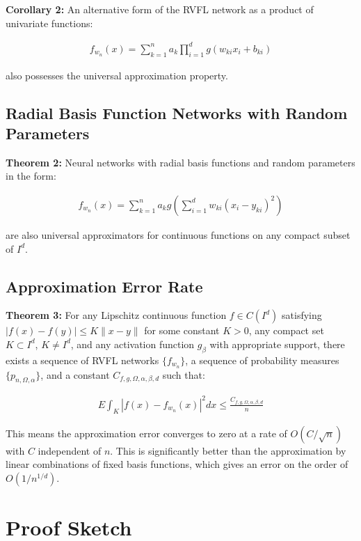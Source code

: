 \documentclass[11pt]{article}
\begin{document}
\textbf{Corollary 2:} An alternative form of the RVFL network as a product of univariate functions:

\begin{align}
f_{w_n}(x) = \sum_{k=1}^n a_k \prod_{i=1}^d g(w_{ki}x_i+b_{ki})
\end{align}

also possesses the universal approximation property.

\subsection{Radial Basis Function Networks with Random Parameters}

\textbf{Theorem 2:} Neural networks with radial basis functions and random parameters in the form:

\begin{align}
f_{w_n}(x) = \sum_{k=1}^n a_k g\left(\sum_{i=1}^d w_{ki}(x_i-y_{ki})^2\right)
\end{align}

are also universal approximators for continuous functions on any compact subset of $I^d$.

\subsection{Approximation Error Rate}

\textbf{Theorem 3:} For any Lipschitz continuous function $f \in C(I^d)$ satisfying $|f(x) - f(y)| \leq K\|x-y\|$ for some constant $K > 0$, any compact set $K \subset I^d$, $K \neq I^d$, and any activation function $g_{\beta}$ with appropriate support, there exists a sequence of RVFL networks $\{f_{w_n}\}$, a sequence of probability measures $\{p_{n,\Omega,\alpha}\}$, and a constant $C_{f,g,\Omega,\alpha,\beta,d}$ such that:

\begin{align}
E\int_K |f(x) - f_{w_n}(x)|^2 dx \leq \frac{C_{f,g,\Omega,\alpha,\beta,d}}{n}
\end{align}

This means the approximation error converges to zero at a rate of $O(C/\sqrt{n})$ with $C$ independent of $n$. This is significantly better than the approximation by linear combinations of fixed basis functions, which gives an error on the order of $O(1/n^{1/d})$.

\section{Proof Sketch}
\end{document}
